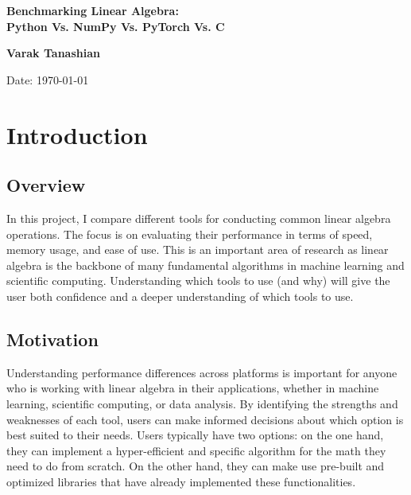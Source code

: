 \documentclass[a4paper,12pt]{article}
\begin{document}
\begin{titlepage}
    \centering
    \vspace*{3cm}
    {\Huge\bfseries Benchmarking Linear Algebra: \\ Python Vs. NumPy Vs. PyTorch Vs. C \par}
    \vspace{2cm}
    {\Large\textbf{Varak Tanashian} \par}
    \vspace{1.5cm}
    {\large Date: \today \par}
    \vfill
\end{titlepage}



\tableofcontents
\newpage


\section{Introduction}
\subsection{Overview}

In this project, I compare different tools for conducting common linear algebra operations. The focus is on evaluating their performance in terms of speed, memory usage, and ease of use. This is an important area of research as linear algebra is the backbone of many fundamental algorithms in machine learning and scientific computing. Understanding which tools to use (and why) will give the user both confidence and a deeper understanding of which tools to use.

\subsection{Motivation}

Understanding performance differences across platforms is important for anyone who is working with linear algebra in their applications, whether in machine learning, scientific computing, or data analysis. By identifying the strengths and weaknesses of each tool, users can make informed decisions about which option is best suited to their needs. Users typically have two options: on the one hand, they can implement a hyper-efficient and specific algorithm for the math they need to do from scratch. On the other hand, they can make use pre-built and optimized libraries that have already implemented these functionalities.
\end{document}
